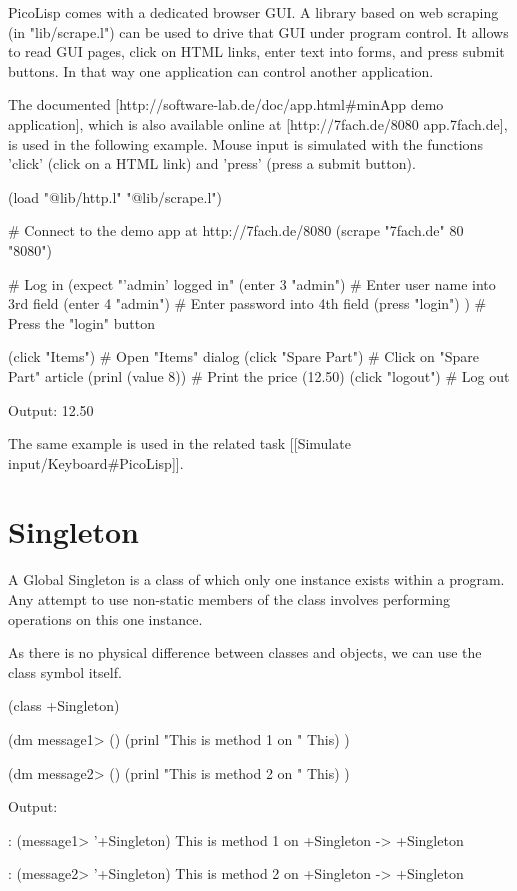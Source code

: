 \begin{wideverbatim}

PicoLisp comes with a dedicated browser GUI. A library based on web scraping (in
"lib/scrape.l") can be used to drive that GUI under program control. It allows
to read GUI pages, click on HTML links, enter text into forms, and press submit
buttons. In that way one application can control another application.

The documented [http://software-lab.de/doc/app.html#minApp demo application],
which is also available online at [http://7fach.de/8080 app.7fach.de], is used
in the following example. Mouse input is simulated with the functions 'click'
(click on a HTML link) and 'press' (press a submit button).

(load "@lib/http.l" "@lib/scrape.l")
 
# Connect to the demo app at http://7fach.de/8080
(scrape "7fach.de" 80 "8080")
 
# Log in
(expect "'admin' logged in"
   (enter 3 "admin")       # Enter user name into 3rd field
   (enter 4 "admin")       # Enter password into 4th field
   (press "login") )       # Press the "login" button
 
(click "Items")         # Open "Items" dialog
(click "Spare Part")    # Click on "Spare Part" article
(prinl (value 8))       # Print the price (12.50)
(click "logout")        # Log out


Output:
12.50

The same example is used in the related task [[Simulate input/Keyboard#PicoLisp]].

\end{wideverbatim}

\pagebreak{}
\section*{Singleton}

A Global Singleton is a class of which only one instance exists within a
program. Any attempt to use non-static members of the class involves
performing operations on this one instance.

\begin{wideverbatim}

As there is no physical difference between classes and objects, we
can use the class symbol itself.

(class +Singleton)

(dm message1> ()
   (prinl "This is method 1 on " This) )

(dm message2> ()
   (prinl "This is method 2 on " This) )

Output:

: (message1> '+Singleton)
This is method 1 on +Singleton
-> +Singleton

: (message2> '+Singleton)
This is method 2 on +Singleton
-> +Singleton

\end{wideverbatim}

